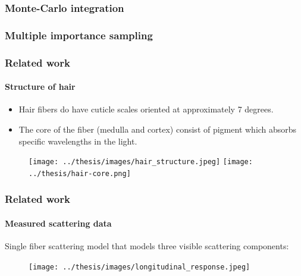 \documentclass{beamer}
\begin{document}
  
  
  \begin{frame}
    \frametitle{Monte-Carlo integration}
  \end{frame}
  
  \begin{frame}
    \frametitle{Multiple importance sampling}
  \end{frame}

  
  \begin{frame}
    \frametitle{Related work}
	\framesubtitle{Structure of hair}
	
	\begin{itemize}
	\item Hair fibers do have cuticle scales oriented at approximately 7 degrees.
	\item The core of the fiber (medulla and cortex) consist of pigment which absorbs specific wavelengths in the light.
	\end{itemize}
	
	\begin{figure}
	\texttt{[image: ../thesis/images/hair\_structure.jpeg]}
	\texttt{[image: ../thesis/hair-core.png]}
	\end{figure}
  \end{frame}
  
  
  \begin{frame}
    \frametitle{Related work}
    \framesubtitle{Measured scattering data}
    Single fiber scattering model that models three visible scattering components:
    
    \begin{figure}
    \centering
    \texttt{[image: ../thesis/images/longitudinal\_response.jpeg]}
    \end{figure}
  \end{frame}
  
\end{document}
